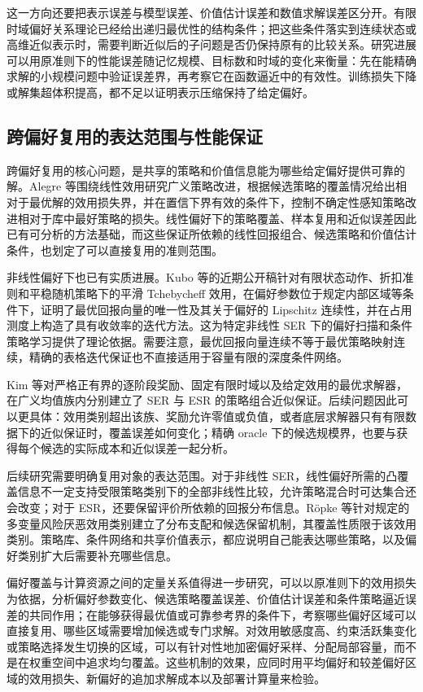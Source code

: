 这一方向还要把表示误差与模型误差、价值估计误差和数值求解误差区分开。有限时域偏好关系理论已经给出递归最优性的结构条件\cite{carr2024}；把这些条件落实到连续状态或高维近似表示时，需要判断近似后的子问题是否仍保持原有的比较关系。研究进展可以用原准则下的性能误差随记忆规模、目标数和时域的变化来衡量：先在能精确求解的小规模问题中验证误差界，再考察它在函数逼近中的有效性。训练损失下降或解集超体积提高，都不足以证明表示压缩保持了给定偏好。

\subsection{跨偏好复用的表达范围与性能保证}\label{sec:future-reuse}

跨偏好复用的核心问题，是共享的策略和价值信息能为哪些给定偏好提供可靠的解。Alegre 等围绕线性效用研究广义策略改进，根据候选策略的覆盖情况给出相对于最优解的效用损失界，并在置信下界有效的条件下，控制不确定性感知策略改进相对于库中最好策略的损失\cite{alegre2026}。线性偏好下的策略覆盖、样本复用和近似误差因此已有可分析的方法基础，而这些保证所依赖的线性回报组合、候选策略和价值估计条件，也划定了可以直接复用的准则范围。

非线性偏好下也已有实质进展。Kubo 等的近期公开稿针对有限状态动作、折扣准则和平稳随机策略下的平滑 Tchebycheff 效用，在偏好参数位于规定内部区域等条件下，证明了最优回报向量的唯一性及其关于偏好的 Lipschitz 连续性，并在占用测度上构造了具有收敛率的迭代方法\cite{kubo2026}。这为特定非线性 SER 下的偏好扫描和条件策略学习提供了理论依据。需要注意，最优回报向量连续不等于最优策略映射连续，精确的表格迭代保证也不直接适用于容量有限的深度条件网络。

Kim 等对严格正有界的逐阶段奖励、固定有限时域以及给定效用的最优求解器，在广义均值族内分别建立了 SER 与 ESR 的策略组合近似保证\cite{kim2025portfolio}。后续问题因此可以更具体：效用类别超出该族、奖励允许零值或负值，或者底层求解器只有有限数据下的近似保证时，覆盖误差如何变化；精确 oracle 下的候选规模界，也要与获得每个候选的实际成本和近似误差一起分析。

后续研究需要明确复用对象的表达范围。对于非线性 SER，线性偏好所需的凸覆盖信息不一定支持受限策略类别下的全部非线性比较，允许策略混合时可达集合还会改变；对于 ESR，还要保留评价所依赖的回报分布信息。Röpke 等针对规定的多变量风险厌恶效用类别建立了分布支配和候选保留机制\cite{ropke2023}，其覆盖性质限于该效用类别。策略库、条件网络和共享价值表示，都应说明自己能表达哪些策略，以及偏好类别扩大后需要补充哪些信息。

偏好覆盖与计算资源之间的定量关系值得进一步研究，可以以原准则下的效用损失为依据，分析偏好参数变化、候选策略覆盖误差、价值估计误差和条件策略逼近误差的共同作用；在能够获得最优值或可靠参考界的条件下，考察哪些偏好区域可以直接复用、哪些区域需要增加候选或专门求解。对效用敏感度高、约束活跃集变化或策略选择发生切换的区域，可以有针对性地加密偏好采样、分配局部容量，而不是在权重空间中追求均匀覆盖。这些机制的效果，应同时用平均偏好和较差偏好区域的效用损失、新偏好的追加求解成本以及部署计算量来检验。

